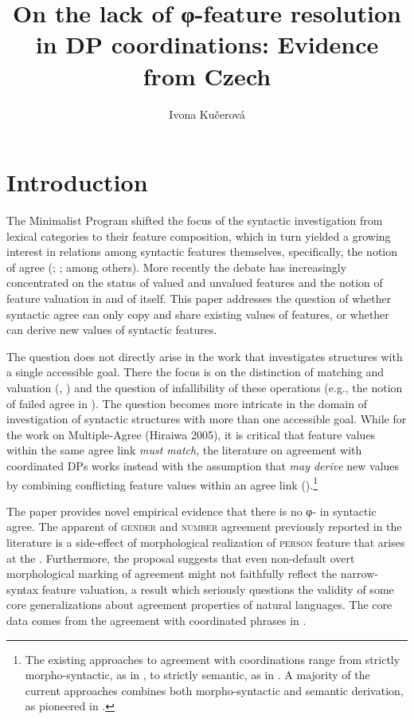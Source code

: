 \documentclass[output=paper,modfontsnewtxmath,hidelinks]{langscibook}
\title{On the lack of φ-feature resolution in DP coordinations: Evidence from Czech}
\author{ Ivona Kučerová\affiliation{McMaster University}}
\begin{document}
\qtreecenterfalse
{}
\maketitle

\section{Introduction}

The Minimalist Program \citep{Chomsky1995} shifted the focus of the syntactic investigation from lexical categories to their feature composition, which in turn yielded a growing interest in relations among syntactic features themselves, specifically, the notion of agree (\citealt{Chomsky2000}; \citealt{Chomsky2001}; among others). More recently the debate has increasingly concentrated on the status of valued and unvalued features \citep{pestorrego07} and the notion of feature valuation in and of itself. This paper addresses the question of whether syntactic agree can only copy and share existing values of features, or whether  can derive new values of syntactic features.

The question does not directly arise in the work that investigates structures with a single accessible goal. There the focus is on the distinction of matching and valuation (\citealt{bejarrezac03}, \citealt{pestorrego07}) and the question of infallibility of these operations (e.g., the notion of failed agree in \citealt{Preminger2009}). The question becomes more intricate in the domain of investigation of syntactic structures with more than one accessible goal. While for the work on Multiple-Agree (Hiraiwa 2005), it is critical that feature values within the same agree link \emph{must match}, the literature on agreement with coordinated DPs works instead with the assumption that  \emph{may derive} new values by combining conflicting feature values within an agree link (\citealt{Farkas1995,King2004,Heycock2005,Marusic2015}).\footnote{The existing approaches to agreement with coordinations range from strictly morpho-syntactic, as in \citet{Marusic2015}, to strictly semantic, as in \citet{Lasersohn1995}. A majority of the current approaches combines both morpho-syntactic and semantic derivation, as pioneered in \citet{Farkas1995}.}

The paper provides novel empirical evidence that there is no φ- in syntactic agree. The apparent  of \textsc{gender} and \textsc{number} agreement previously reported in the literature is a side-effect of morphological realization of \textsc{person} feature that arises at the . Furthermore, the proposal suggests that even non-default overt morphological marking of agreement might not faithfully reflect the narrow-syntax feature valuation, a result which seriously questions the validity of some core generalizations about agreement properties of natural languages. The core data comes from the agreement with coordinated  phrases in .
\end{document}
